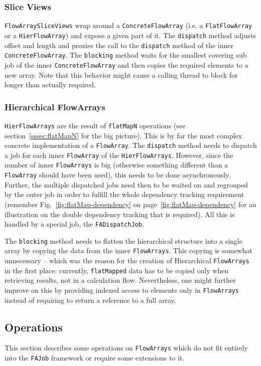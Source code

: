 \documentclass[runningheads,a4paper,fleqn]{llncs}
\begin{document}
\subsubsection{Slice Views}
\texttt{FlowArraySliceViews} wrap around a \texttt{ConcreteFlowArray}
(i.e. a \texttt{FlatFlowArray} or a \texttt{HierFlowArray})
and expose a given part of it. The \texttt{dispatch} method adjusts 
offset and length and proxies the call to the \texttt{dispatch} method
of the inner
\texttt{ConcreteFlowArray}. The \texttt{blocking} method waits for the
smallest covering sub job of the inner \texttt{ConcreteFlowArray} and
then copies the required elements to a new array. Note that this
behavior might cause a calling thread to block for longer than
actually required.

\subsubsection{Hierarchical FlowArrays}
\texttt{HierFlowArrays} are the result of \texttt{flatMapN} operations
(see section~\ref{sssec:flatMapN} for the big picture). This is by far
the most complex concrete implementation of a \texttt{FlowArray}. The
\texttt{dispatch} method needs to dispatch a job for each inner
\texttt{FlowArray} of the \texttt{HierFlowArrays}. However, since the number of
inner \texttt{FlowArrays} is big (otherwise something different than a \texttt{FlowArray}
should have been used), 
this needs to be done asynchronously. Further, the multiple dispatched
jobs need then to be waited on and regrouped by the outer job in order
to fulfill the whole dependency tracking requirement (remember
Fig.~\ref{fig:flatMap-dependency} on
page~\ref{fig:flatMap-dependency} for an illustration on the
double dependency tracking that is required). All this is handled by a 
special job, the \texttt{FADispatchJob}.

The \texttt{blocking} method needs to flatten the hierarchical
structure into a single array by copying the data from the inner
\texttt{FlowArrays}. This copying is somewhat unnecessary -- which 
was the reason for the creation of Hierarchical \texttt{FlowArrays} in the
first place: currently, \texttt{flatMapped} data has to be copied only when
retrieving results, not in a calculation flow. Nevertheless, one might
further improve on this by providing indexed access to elements only
in \texttt{FlowArrays} instead of requiring to return a reference to a full
array.

\subsection{Operations}
\label{ssec:imp-operations}
This section describes some operations on \texttt{FlowArrays} which do not fit
entirely into the \texttt{FAJob} framework or require some extensions
to it.
\end{document}

